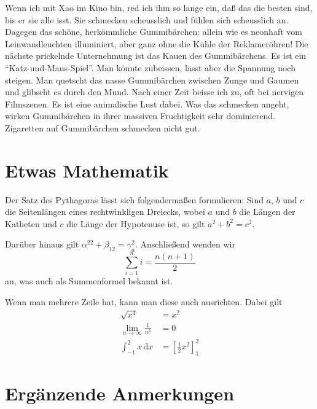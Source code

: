 Wenn ich mit Xao im Kino bin, red ich ihm so lange ein, daß das die besten sind, bis er sie alle isst. Sie schmecken scheusslich und fühlen sich scheusslich an. Dagegen das schöne, herkömmliche Gummibärchen: allein wie es neonhaft vom Leinwandleuchten illuminiert, aber ganz ohne die Kühle der Reklameröhren! Die nächste prickelnde Unternehmung ist das Kauen des Gummibärchens. Es ist ein \enquote{Katz-und-Maus-Spiel}. Man könnte zubeissen, lässt aber die Spannung noch steigen. Man quetscht das nasse Gummibärchen zwischen Zunge und Gaumen und glibscht es durch den Mund. Nach einer Zeit beisse ich zu, oft bei nervigen Filmszenen. Es ist eine animalische Lust dabei. Was das schmecken angeht, wirken Gummibärchen in ihrer massiven Fruchtigkeit sehr dominierend. Zigaretten auf Gummibärchen schmecken nicht gut.

\section{Etwas Mathematik}

Der Satz des Pythagoras lässt sich folgendermaßen formulieren: Sind $a$, $b$ und $c$ die Seitenlängen eines rechtwinkligen Dreiecks, wobei $a$ und $b$ die Längen der Katheten und $c$ die Länge der Hypotenuse ist, so gilt $a^2 + b^2 = c^2$.

Darüber hinaus gilt $\alpha^{22} + \beta_{12} = \gamma^2_a$. Anschließend wenden wir
\[ \sum^n_{i=1}i = \frac{n(n+1)}2 \]
an, was auch als Summenformel bekannt ist.

Wenn man mehrere Zeile hat, kann man diese auch ausrichten. Dabei gilt
\begin{align*}
  \sqrt{x^4} &= x^2\\
  \lim_{n\to\infty} \frac 1{n^2} &= 0 \\
  \int_{-1}^2 x\, \mathrm{d}x &= \left[ \frac12 x^2 \right]_1^2
\end{align*}

\section{Ergänzende Anmerkungen}

